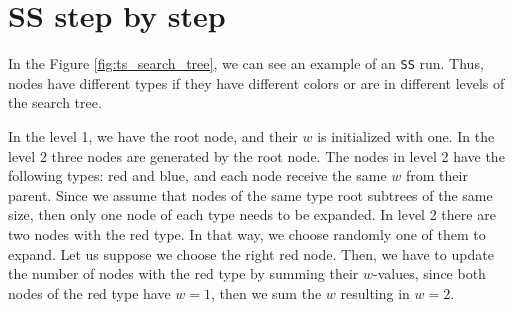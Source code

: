 \fi

\section{SS step by step}
\noindent
In the Figure \ref{fig:ts_search_tree}, we can see an example of an \texttt{SS} run. Thus, nodes have different types if they have different colors or are in different levels of the search tree.

In the level 1, we have the root node, and their $w$ is initialized with one. In the level 2 three nodes are generated by the root node. The nodes in level 2 have the following types: red and blue, and each node receive the same $w$ from their parent. Since we assume that nodes of the same type root subtrees of the same size, then only one node of each type needs to be expanded. In level 2 there are two nodes with the red type. In that way, we choose randomly one of them to expand. Let us suppose we choose the right red node. Then, we have to update the number of nodes with the red type by summing their $w$-values, since both nodes of the red type have $w = 1$, then we sum the $w$ resulting in $w=2$.

